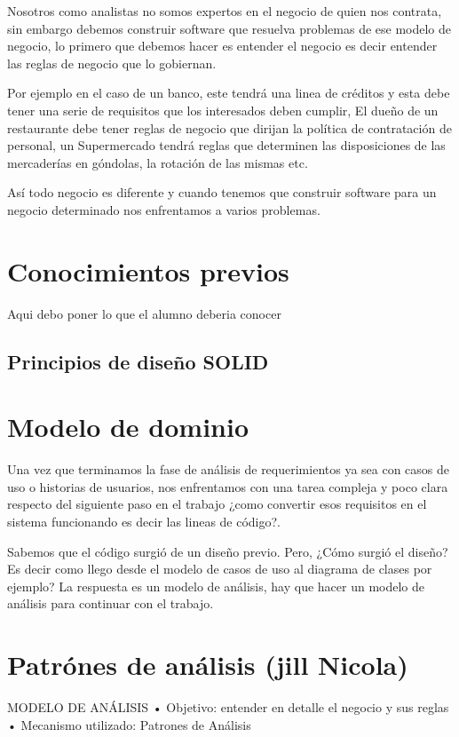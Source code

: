 \documentclass[12pt]{book}
\begin{document}
Nosotros como analistas no somos expertos en el negocio de quien nos contrata, sin embargo debemos construir software que resuelva problemas de ese modelo de negocio, lo primero que debemos hacer es entender el negocio es decir entender las reglas de negocio que lo gobiernan.

Por ejemplo en el caso de un banco, este tendrá una linea de créditos y esta debe tener una serie de requisitos que los interesados deben cumplir,  El dueño de un restaurante debe tener reglas de negocio que dirijan la política de contratación de personal, un Supermercado tendrá reglas que determinen las disposiciones de las mercaderías en góndolas, la rotación de las mismas etc.

Así todo negocio es diferente y cuando tenemos que construir software para un negocio determinado nos enfrentamos a varios problemas.

\section{Conocimientos previos}
Aqui debo poner lo que el alumno deberia conocer
\subsection{Principios de diseño SOLID}


\section{Modelo de dominio}
Una vez que terminamos la fase de análisis de requerimientos ya sea con casos de uso o historias de usuarios, nos enfrentamos con una tarea compleja y poco clara respecto del siguiente paso en el trabajo ¿como convertir esos requisitos en el sistema funcionando es decir las lineas de código?.

Sabemos que el código surgió de un diseño previo. Pero, ¿Cómo surgió el diseño? Es decir como llego desde el modelo de casos de uso al diagrama de clases por ejemplo?
La respuesta es un modelo de análisis, hay que hacer un modelo de análisis para continuar con el trabajo.


\section{Patr\'ones de análisis (jill Nicola)}

MODELO DE ANÁLISIS 
• Objetivo: entender en detalle el negocio y sus reglas 
• Mecanismo utilizado: Patrones de Análisis 
\end{document}
